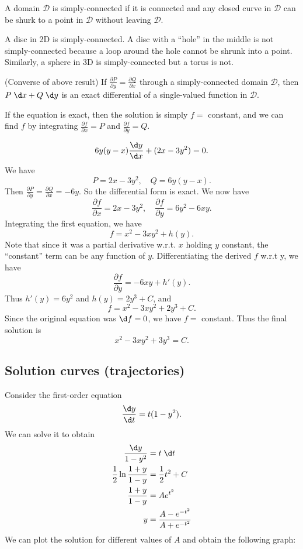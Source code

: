 \documentclass[a4paper]{article}
\begin{document}
\begin{defi}
  A domain $\mathcal{D}$ is simply-connected if it is connected and any closed curve in $\mathcal{D}$ can be shurk to a point in $\mathcal{D}$ without leaving $\mathcal{D}$.
\end{defi}

\begin{eg}
  A disc in 2D is simply-connected. A disc with a ``hole'' in the middle is not simply-connected because a loop around the hole cannot be shrunk into a point. Similarly, a sphere in 3D is simply-connected but a torus is not. 
\end{eg}

\begin{thm}
  (Converse of above result) If $\frac{\partial P}{\partial y} = \frac{\partial Q}{\partial x}$ through a simply-connected domain $\mathcal{D}$, then $P\;\d x + Q\; \d y$ is an exact differential of a single-valued function in $\mathcal{D}$.
\end{thm}
If the equation is exact, then the solution is simply $f = $ constant, and we can find $f$ by integrating $\frac{\partial f}{\partial x} = P$ and $\frac{\partial f}{\partial y} = Q$.

\begin{eg}
  \[
  6y(y - x)\frac{\d y}{\d x} + (2x - 3y^2) = 0.
  \]
  We have
  \[
  P = 2x - 3y^2, \quad Q = 6y(y - x).
  \]
  Then $\frac{\partial P}{\partial y} = \frac{\partial Q}{\partial x} = -6y$. So the differential form is exact. We now have
  \[
  \frac{\partial f}{\partial x} = 2x - 3y^2, \quad \frac{\partial f}{\partial y} = 6y^2 - 6xy.
  \]
  Integrating the first equation, we have
  \[
  f = x^2 - 3xy^2 + h(y).
  \]
  Note that since it was a partial derivative w.r.t. $x$ holding $y$ constant, the ``constant'' term can be any function of $y$. Differentiating the derived $f$ w.r.t y, we have
  \[
  \frac{\partial f}{\partial y} = -6xy + h'(y).
  \]
  Thus $h'(y) = 6y^2$ and $h(y) = 2y^3 + C$, and 
  \[
  f = x^2 - 3xy^2 + 2y^3 + C.
  \]
  Since the original equation was $\d f = 0$, we have $f = $ constant. Thus the final solution is
  \[
  x^2 - 3xy^2 + 3y^3 = C.
  \]
\end{eg}

\subsection{Solution curves (trajectories)}
\begin{eg}
  Consider the first-order equation
  \[
  \frac{\d y}{\d t} = t(1 - y^2).
  \]
  We can solve it to obtain 
  \begin{align*}
    \frac{\d y}{1 - y^2} &= t\; \d t\\
    \frac{1}{2}\ln\frac{1 + y}{1 - y} &= \frac{1}{2}t^2 + C\\
    \frac{1 + y}{1 - y} &= Ae^{t^2}\\
    y &= \frac{A - e^{-t^2}}{A + e^{-t^2}}
  \end{align*}
  We can plot the solution for different values of $A$ and obtain the following graph:
\end{eg}
\end{document}
